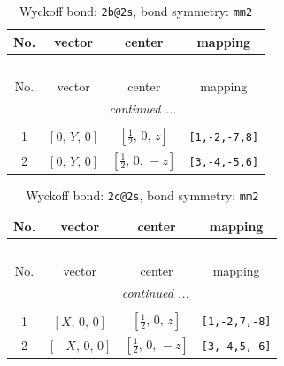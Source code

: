 \documentclass[fleqn,8pt]{jsarticle}
\begin{document}
\renewcommand{\arraystretch}{1.2}
\begin{longtable}{cccc}
\caption{Wyckoff bond: {\tt 2b@2s}, bond symmetry: {\tt mm2}}
 \\
 \hline \hline
No. & vector & center & mapping \\ \hline \endfirsthead

\multicolumn{3}{l}{\tablename\ \thetable{}} \\
 \hline \hline
No. & vector & center & mapping \\ \hline \endhead

 \hline \hline
\multicolumn{3}{r}{\footnotesize\it continued ...} \\ \endfoot

 \hline \hline
\multicolumn{3}{r}{} \\ \endlastfoot

1 & $\left[ 0,\, Y,\, 0 \right]$ & $\left[ \frac{1}{2},\, 0,\, z \right]$ & {\tt [1,-2,-7,8]} \\ \hline
2 & $\left[ 0,\, Y,\, 0 \right]$ & $\left[ \frac{1}{2},\, 0,\, - z \right]$ & {\tt [3,-4,-5,6]} \\
\end{longtable}
\renewcommand{\arraystretch}{1.2}
\begin{longtable}{cccc}
\caption{Wyckoff bond: {\tt 2c@2s}, bond symmetry: {\tt mm2}}
 \\
 \hline \hline
No. & vector & center & mapping \\ \hline \endfirsthead

\multicolumn{3}{l}{\tablename\ \thetable{}} \\
 \hline \hline
No. & vector & center & mapping \\ \hline \endhead

 \hline \hline
\multicolumn{3}{r}{\footnotesize\it continued ...} \\ \endfoot

 \hline \hline
\multicolumn{3}{r}{} \\ \endlastfoot

1 & $\left[ X,\, 0,\, 0 \right]$ & $\left[ \frac{1}{2},\, 0,\, z \right]$ & {\tt [1,-2,7,-8]} \\ \hline
2 & $\left[ - X,\, 0,\, 0 \right]$ & $\left[ \frac{1}{2},\, 0,\, - z \right]$ & {\tt [3,-4,5,-6]} \\
\end{longtable}
\renewcommand{\arraystretch}{1.2}
\end{document}
